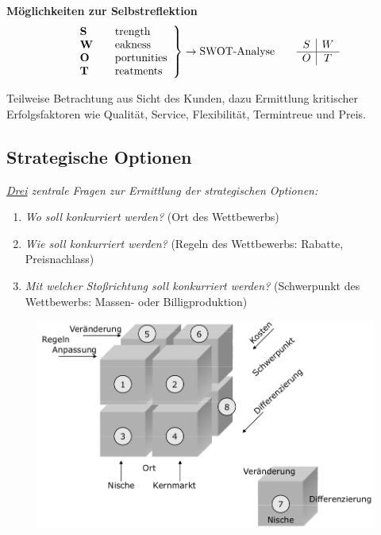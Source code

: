 \documentclass[a4paper,11pt, twoside]{article}
\newcommand\mpar[1]{\marginpar {\flushleft\small #1}}
\begin{document}
\textbf{Möglichkeiten zur Selbstreflektion}
\mpar{\textcolor{red}{Erhebungen durch Kundenbefragung ODER Vergleich mit Konkurrenz}}
\[ \left.
\begin{array}{l l}
\text{\textbf{S}} & \quad \text{trength}\\
\text{\textbf{W}} & \quad \text{eakness}\\
\text{\textbf{O}} & \quad \text{portunities}\\
\text{\textbf{T}} & \quad \text{reatments}
\end{array} 
\right\} \to \text{SWOT-Analyse} \quad \quad	\begin{array}{c|c}
					  	 S & W \\
					  	 \hline
					  	 O & T
						\end{array} \]

Teilweise Betrachtung aus Sicht des Kunden, dazu Ermittlung kritischer Erfolgsfaktoren wie Qualität, Service, Flexibilität, Termintreue und Preis.

\subsection{Strategische Optionen}

\mpar{\textcolor{red}{Nischenmarkt: schwierig, falls besetzt}}
\textit{\underline{Drei} zentrale Fragen zur Ermittlung der strategischen Optionen:}
\begin{enumerate}
	\item \textit{Wo soll konkurriert werden?} (Ort des Wettbewerbs)
	\item \textit{Wie soll konkurriert werden?} (Regeln des Wettbewerbs: Rabatte, Preisnachlass)
	\item \textit{Mit welcher Stoßrichtung soll konkurriert werden?} (Schwerpunkt des Wettbewerbs: Massen- oder Billigproduktion)
\end{enumerate}

\begin{figure}[h]
 \begin{center}
   \includegraphics[scale=0.3]{bilder/strategische_optionen.png}
 \end{center}
\end{figure}
\end{document}
